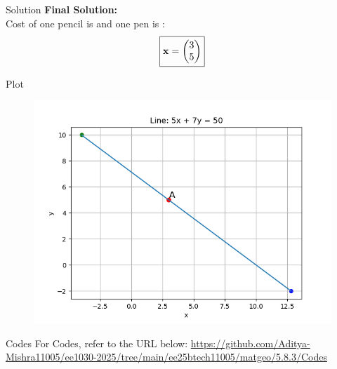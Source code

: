 \documentclass{beamer}
\begin{document}
\begin{frame}{Solution}
\textbf{Final Solution:}\\
Cost of one pencil is  and one pen is :
\[
\boxed{
\mathbf{x} = \begin{pmatrix}3 \\ 5\end{pmatrix}
}
\]
\end{frame}
\begin{frame}{Plot}
\begin{figure}
    \centering
    \includegraphics[width=0.8\columnwidth]{Figs/Figure_1.png}
\end{figure}
\end{frame}
\begin{frame}{Codes}
\centering
For Codes, refer to the URL below:  
\url{https://github.com/Aditya-Mishra11005/ee1030-2025/tree/main/ee25btech11005/matgeo/5.8.3/Codes}
\end{frame}
\end{document}
